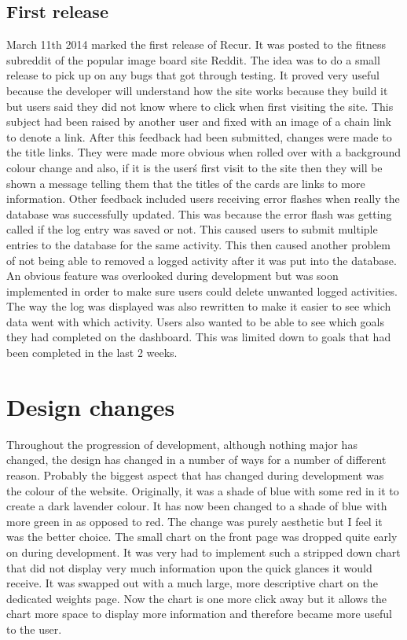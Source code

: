 \subsection{First release}
March 11th 2014 marked the first release of Recur. It was posted to the fitness subreddit of the popular image board site Reddit\citep{reddit:2005}. The idea was to do a small release to pick up on any bugs that got through testing. It proved very useful because the developer will understand how the site works because they build it but users said they did not know where to click when first visiting the site. This subject had been raised by another user and fixed with an image of a chain link to denote a link. After this feedback had been submitted, changes were made to the title links. They were made more obvious when rolled over with a background colour change and also, if it is the user\'s first visit to the site then they will be shown a message telling them that the titles of the cards are links to more information. Other feedback included users receiving error flashes when really the database was successfully updated. This was because the error flash was getting called if the log entry was saved or not. This caused users to submit multiple entries to the database for the same activity. This then caused another problem of not being able to removed a logged activity after it was put into the database. An obvious feature was overlooked during development but was soon implemented in order to make sure users could delete unwanted logged activities. The way the log was displayed was also rewritten to make it easier to see which data went with which activity. Users also wanted to be able to see which goals they had completed on the dashboard. This was limited down to goals that had been completed in the last 2 weeks.

\section{Design changes}
Throughout the progression of development, although nothing major has changed, the design has changed in a number of ways for a number of different reason. Probably the biggest aspect that has changed during development was the colour of the website. Originally, it was a shade of blue with some red in it to create a dark lavender colour. It has now been changed to a shade of blue with more green in as opposed to red. The change was purely aesthetic but I feel it was the better choice. The small chart on the front page was dropped quite early on during development. It was very had to implement such a stripped down chart that did not display very much information upon the quick glances it would receive. It was swapped out with a much large, more descriptive chart on the dedicated weights page. Now the chart is one more click away but it allows the chart more space to display more information and therefore became more useful to the user.

